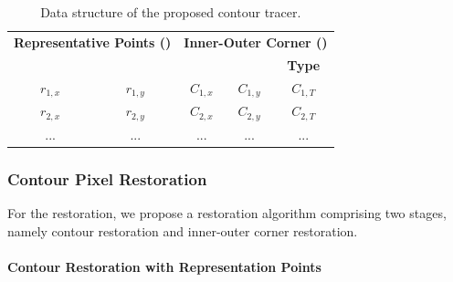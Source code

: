 \documentclass[sensors,article,accept,moreauthors,pdftex,10pt,a4paper]{mdpi}
\begin{document}
 \begin{table}[H]
	\centering
	\begin{tabular}{ccccc}
		\toprule
		\multicolumn{2}{c}{\textbf{Representative Points (\boldmath{$R_i$})}} & 
		\multicolumn{3}{c}{\textbf{Inner-Outer Corner (\boldmath{$C_i$})}} \\
\cmidrule(rl){1-2}\cmidrule(rl){3-5}
		\boldmath{$x$} & \boldmath{$y$} & \boldmath{$x$} & \boldmath{$y$} & \textbf{Type} \\
		\midrule

		$r_{1,x}$ & $r_{1,y}$ & $C_{1,x}$ & $C_{1,y}$ & $C_{1,T}$ \\
		$r_{2,x}$ & $r_{2,y}$ & $C_{2,x}$ & $C_{2,y}$ & $C_{2,T}$ \\
		... & ... & ... & ... & ...\\
		\bottomrule
	\end{tabular}
	\caption{Data structure of the proposed contour tracer.}
	\label{table:data_structure}
\end{table}

\subsubsection{Contour Pixel Restoration}


For the restoration, we propose a restoration algorithm comprising two stages, namely contour restoration and inner-outer corner restoration.


\paragraph{Contour Restoration with Representation Points}

\end{document}
